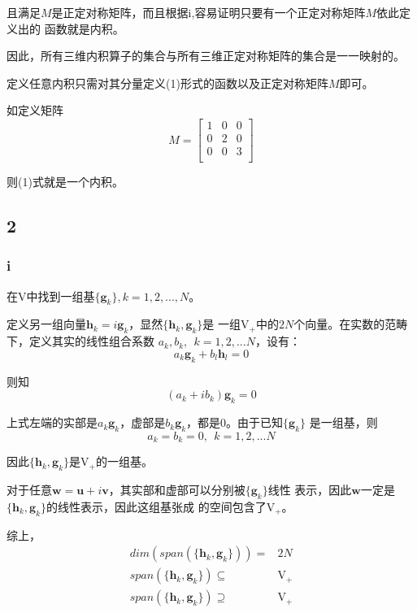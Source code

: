 \documentclass[UTF8,c5size]{ctexart}
\begin{document}
且满足$M$是正定对称矩阵，而且根据i,容易证明只要有一个正定对称矩阵$M$依此定义出的
函数就是内积。

因此，所有三维内积算子的集合与所有三维正定对称矩阵的集合是一一映射的。

定义任意内积只需对其分量定义(1)形式的函数以及正定对称矩阵$M$即可。

如定义矩阵
$$
M=\begin{bmatrix}
    1&0&0\\
    0&2&0\\
    0&0&3\\
\end{bmatrix}
$$

则(1)式就是一个内积。

\subsection*{2}

\subsubsection*{i}

在$\mathrm{V}$中找到一组基$\{\bm{g}_k\}, k=1,2,...,N$。

定义另一组向量$\bm{h}_k=i\bm{g}_k$，显然$\{\bm{h}_k,\bm{g}_k\}$是
一组$\mathrm{V_+}$中的$2N$个向量。在实数的范畴下，定义其实的线性组合系数
$a_k,b_k,\ \ k=1,2,...N$，设有：
$$
a_k\bm{g}_k+b_l\bm{h}_l=0
$$

则知
$$
(a_k+ib_k)\bm{g}_k=0
$$

上式左端的实部是$a_k\bm{g}_k$，虚部是$b_k\bm{g}_k$，都是0。由于已知$\{\bm{g}_k\}$
是一组基，则
$$
a_k=b_k=0,\ \ k=1,2,...N
$$

因此$\{\bm{h}_k,\bm{g}_k\}$是$\mathrm{V_+}$的一组基。

对于任意$\bm{w}=\bm{u}+i\bm{v}$，其实部和虚部可以分别被$\{\bm{g}_k\}$线性
表示，因此$\bm{w}$一定是$\{\bm{h}_k,\bm{g}_k\}$的线性表示，因此这组基张成
的空间包含了$\mathrm{V_+}$。

综上，
\begin{equation*}
    \begin{split}
        dim(span(\{\bm{h}_k,\bm{g}_k\}))=&2N\\
    span(\{\bm{h}_k,\bm{g}_k\})\subseteq&\mathrm{V_+}\\
    span(\{\bm{h}_k,\bm{g}_k\})\supseteq&\mathrm{V_+}\\
    \end{split}
\end{equation*}
\end{document}
